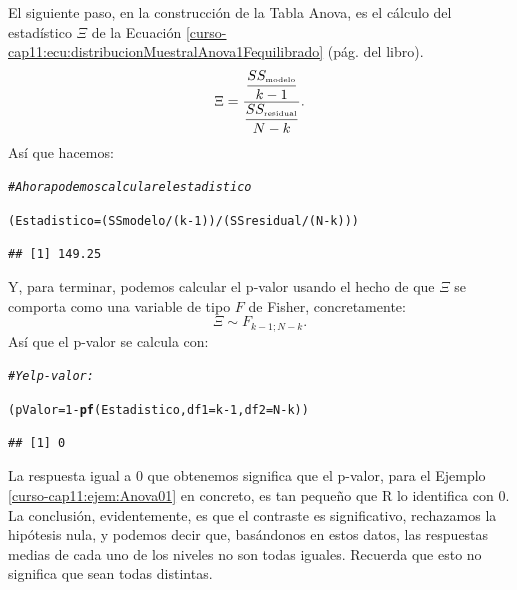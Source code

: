 \documentclass[10pt,a4paper]{article}\usepackage[]{graphicx}\usepackage[]{color}
\makeatletter
\newcommand{\hlnum}[1]{\textcolor[rgb]{0.686,0.059,0.569}{#1}}%
\newcommand{\hlcom}[1]{\textcolor[rgb]{0.678,0.584,0.686}{\textit{#1}}}%
\newcommand{\hlopt}[1]{\textcolor[rgb]{0,0,0}{#1}}%
\newcommand{\hlstd}[1]{\textcolor[rgb]{0.345,0.345,0.345}{#1}}%
\newcommand{\hlkwb}[1]{\textcolor[rgb]{0.69,0.353,0.396}{#1}}%
\newcommand{\hlkwc}[1]{\textcolor[rgb]{0.333,0.667,0.333}{#1}}%
\newcommand{\hlkwd}[1]{\textcolor[rgb]{0.737,0.353,0.396}{\textbf{#1}}}%
\newenvironment{kframe}{%
 \def\at@end@of@kframe{}%
 \ifinner\ifhmode%
  \def\at@end@of@kframe{\end{minipage}}%
  \begin{minipage}{\columnwidth}%
 \fi\fi%
 \def\FrameCommand##1{\hskip\@totalleftmargin \hskip-\fboxsep
 \colorbox{shadecolor}{##1}\hskip-\fboxsep
     \hskip-\linewidth \hskip-\@totalleftmargin \hskip\columnwidth}%
 \MakeFramed {\advance\hsize-\width
   \@totalleftmargin\z@ \linewidth\hsize
   \@setminipage}}%
 {\par\unskip\endMakeFramed%
 \at@end@of@kframe}
\newenvironment{knitrout}{}{} %
\newcounter {cont01}
\makeatother
\begin{document}
El siguiente paso, en la construcción de la Tabla Anova, es el cálculo del estadístico $\Xi$ de la Ecuación \ref{curso-cap11:ecu:distribucionMuestralAnova1Fequilibrado} (pág. \pageref{curso-cap11:ecu:distribucionMuestralAnova1Fequilibrado} del libro).
\[
\Xi=\dfrac{\dfrac{SS_{\mbox{\tiny modelo}}}{k-1}}{\dfrac{SS_{\mbox{\tiny residual}}}{N-k}}.
\]
Así que hacemos:

\begin{knitrout}
\color{fgcolor}\begin{kframe}
\begin{alltt}
\hlcom{# Ahora podemos calcular el estadistico}

\hlstd{(Estadistico} \hlkwb{=} \hlstd{( SSmodelo} \hlopt{/} \hlstd{(k} \hlopt{-} \hlnum{1}\hlstd{) )} \hlopt{/} \hlstd{( SSresidual} \hlopt{/} \hlstd{( N} \hlopt{-} \hlstd{k ) ))}
\end{alltt}
\begin{verbatim}
## [1] 149.25
\end{verbatim}
\end{kframe}
\end{knitrout}

Y, para terminar, podemos calcular el p-valor usando el hecho de que $\Xi$ se comporta como una variable de tipo $F$ de Fisher, concretamente:
\[\Xi \sim F_{k-1;N-k}.\]
Así que el p-valor se calcula con:

\begin{knitrout}
\color{fgcolor}\begin{kframe}
\begin{alltt}
\hlcom{# Y el p-valor:}

\hlstd{(pValor}\hlkwb{=}\hlnum{1}\hlopt{-}\hlkwd{pf}\hlstd{(Estadistico,}\hlkwc{df1}\hlstd{= k}\hlopt{-}\hlnum{1}\hlstd{,} \hlkwc{df2}\hlstd{= N}\hlopt{-}\hlstd{k ))}
\end{alltt}
\begin{verbatim}
## [1] 0
\end{verbatim}
\end{kframe}
\end{knitrout}


La respuesta igual a $0$ que obtenemos significa que el p-valor, para el Ejemplo \ref{curso-cap11:ejem:Anova01} en concreto, es tan pequeño que R lo identifica con $0$. La conclusión, evidentemente, es que el contraste es significativo, rechazamos la hipótesis nula, y podemos decir que, basándonos en estos datos, las respuestas medias de cada uno de los niveles no son todas iguales. Recuerda que esto no significa que sean todas distintas.
\end{document}
